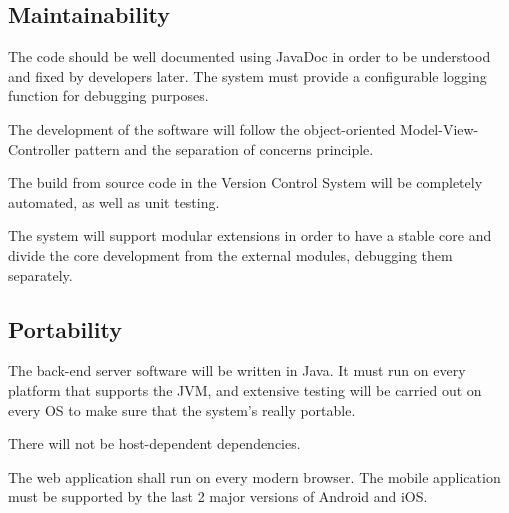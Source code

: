 \subsection{Maintainability}


The code should be well documented using JavaDoc in order to be understood and fixed by developers later.
The system must provide a configurable logging function for debugging purposes.

The development of the software will follow the object-oriented Model-View-Controller pattern and the separation of concerns principle.

The build from source code in the Version Control System will be completely automated, as well as unit testing.

The system will support modular extensions in order to have a stable core and divide the core development from the external modules, debugging them separately.

\subsection{Portability}

The back-end server software will be written in Java. It must run on every platform that supports the JVM, and extensive testing will be carried out on every OS to make sure that the system's really portable.

There will not be host-dependent dependencies.

The web application shall run on every modern browser. %
The mobile application must be supported by the last 2 major versions of Android and iOS.
